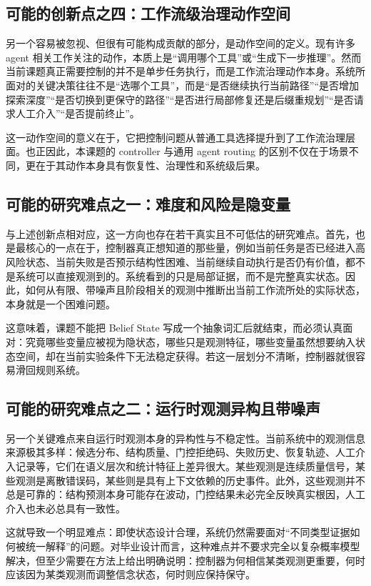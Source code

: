 \subsection{可能的创新点之四：工作流级治理动作空间}

另一个容易被忽视、但很有可能构成贡献的部分，是动作空间的定义。现有许多 agent 相关工作关注的动作，本质上是“调用哪个工具”或“生成下一步推理”。然而当前课题真正需要控制的并不是单步任务执行，而是工作流治理动作本身。系统所面对的关键决策往往不是“选哪个工具”，而是“是否继续执行当前路径”“是否增加探索深度”“是否切换到更保守的路径”“是否进行局部修复还是后缀重规划”“是否请求人工介入”“是否提前终止”。

这一动作空间的意义在于，它把控制问题从普通工具选择提升到了工作流治理层面。也正因此，本课题的 controller 与通用 agent routing 的区别不仅在于场景不同，更在于其动作本身具有恢复性、治理性和系统级后果。

\subsection{可能的研究难点之一：难度和风险是隐变量}

与上述创新点相对应，这一方向也存在若干真实且不可低估的研究难点。首先，也是最核心的一点在于，控制器真正想知道的那些量，例如当前任务是否已经进入高风险状态、当前失败是否预示结构性困难、当前继续自动执行是否仍有价值，都不是系统可以直接观测到的。系统看到的只是局部证据，而不是完整真实状态。因此，如何从有限、带噪声且阶段相关的观测中推断出当前工作流所处的实际状态，本身就是一个困难问题。

这意味着，课题不能把 Belief State 写成一个抽象词汇后就结束，而必须认真面对：究竟哪些变量应被视为隐状态，哪些只是观测特征，哪些变量虽然想要纳入状态空间，却在当前实验条件下无法稳定获得。若这一层划分不清晰，控制器就很容易滑回规则系统。

\subsection{可能的研究难点之二：运行时观测异构且带噪声}

另一个关键难点来自运行时观测本身的异构性与不稳定性。当前系统中的观测信息来源极其多样：候选分布、结构质量、门控拒绝码、失败历史、恢复轨迹、人工介入记录等，它们在语义层次和统计特征上差异很大。某些观测是连续质量信号，某些观测是离散错误码，某些则是具有上下文依赖的历史事件。此外，这些观测并不总是可靠的：结构预测本身可能存在波动，门控结果未必完全反映真实根因，人工介入也未必总具有一致性。

这就导致一个明显难点：即使状态设计合理，系统仍然需要面对“不同类型证据如何被统一解释”的问题。对毕业设计而言，这种难点并不要求完全以复杂概率模型解决，但至少需要在方法上给出明确说明：控制器为何相信某类观测更重要，何时应该因为某类观测而调整信念状态，何时则应保持保守。

